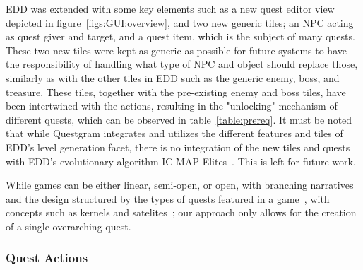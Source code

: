 

EDD was extended with some key elements such as a new quest editor view depicted in figure~\ref{figs:GUI:overview}, and two new generic tiles; an NPC acting as quest giver and target, and a quest item, which is the subject of many quests. These two new tiles were kept as generic as possible for future systems to have the responsibility of handling what type of NPC and object should replace those, similarly as with the other tiles in EDD such as the generic enemy, boss, and treasure. These tiles, together with the pre-existing enemy and boss tiles, have been intertwined with the actions, resulting in the "unlocking" mechanism of different quests, which can be observed in table~\ref{table:prereq}. It must be noted that while Questgram integrates and utilizes the different features and tiles of EDD's level generation facet, there is no integration of the new tiles and quests with EDD's evolutionary algorithm IC MAP-Elites~. This is left for future work.

While games can be either linear, semi-open, or open, with branching narratives and the design structured by the types of quests featured in a game~, with concepts such as kernels and satelites~; our approach only allows for the creation of a single overarching quest.





\subsubsection{Quest Actions}

